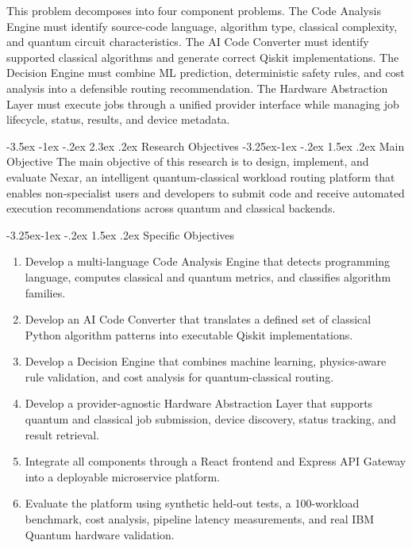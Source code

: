 \documentclass[12pt,a4paper]{report}
\makeatletter
\renewcommand\section{\@startsection{section}{1}{\z@}%
  {-3.5ex \@plus -1ex \@minus -.2ex}%
  {2.3ex \@plus.2ex}%
  {\normalfont\bfseries\fontsize{12pt}{16pt}\selectfont}}
\renewcommand\subsection{\@startsection{subsection}{2}{\z@}%
  {-3.25ex\@plus -1ex \@minus -.2ex}%
  {1.5ex \@plus .2ex}%
  {\normalfont\bfseries\fontsize{12pt}{16pt}\selectfont}}
\makeatother
\begin{document}
This problem decomposes into four component problems. The Code Analysis Engine must identify source-code language, algorithm type, classical complexity, and quantum circuit characteristics. The AI Code Converter must identify supported classical algorithms and generate correct Qiskit implementations. The Decision Engine must combine ML prediction, deterministic safety rules, and cost analysis into a defensible routing recommendation. The Hardware Abstraction Layer must execute jobs through a unified provider interface while managing job lifecycle, status, results, and device metadata.

\section{Research Objectives}
\subsection{Main Objective}
The main objective of this research is to design, implement, and evaluate Nexar, an intelligent quantum-classical workload routing platform that enables non-specialist users and developers to submit code and receive automated execution recommendations across quantum and classical backends.

\subsection{Specific Objectives}
\begin{enumerate}
\item Develop a multi-language Code Analysis Engine that detects programming language, computes classical and quantum metrics, and classifies algorithm families.
\item Develop an AI Code Converter that translates a defined set of classical Python algorithm patterns into executable Qiskit implementations.
\item Develop a Decision Engine that combines machine learning, physics-aware rule validation, and cost analysis for quantum-classical routing.
\item Develop a provider-agnostic Hardware Abstraction Layer that supports quantum and classical job submission, device discovery, status tracking, and result retrieval.
\item Integrate all components through a React frontend and Express API Gateway into a deployable microservice platform.
\item Evaluate the platform using synthetic held-out tests, a 100-workload benchmark, cost analysis, pipeline latency measurements, and real IBM Quantum hardware validation.
\end{enumerate}
\end{document}
